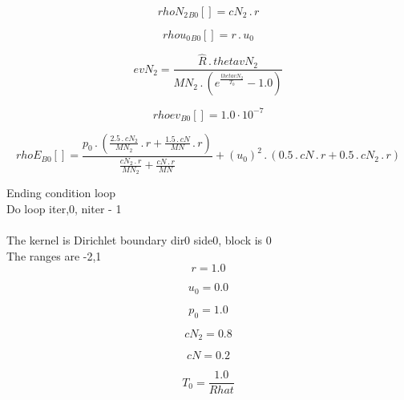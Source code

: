 \documentclass{article}
\begin{document}
\begin{dmath}{rhoN_{2}{_{B0}}}[{}] = cN_{2} \,.\, r\end{dmath}

\begin{dmath}{rhou_{0}{_{B0}}}[{}] = r \,.\, u_{0}\end{dmath}

\begin{dmath}evN_{2} = \frac{\hat{R} \,.\, thetavN_{2}}{MN_{2} \,.\, \left(e^{\frac{thetavN_{2}}{T_{0}}} - 1.0\right)}\end{dmath}

\begin{dmath}{rhoev{_{B0}}}[{}] = 1.0 \cdot 10^{-7}\end{dmath}

\begin{dmath}{rhoE{_{B0}}}[{}] = \frac{p_{0} \,.\, \left(\frac{2.5 \,.\, cN_{2}}{MN_{2}} \,.\, r + \frac{1.5 \,.\, cN}{MN} \,.\, r\right)}{\frac{cN_{2} \,.\, r}{MN_{2}} + \frac{cN \,.\, r}{MN}} + \left(u_{0} \right)^{2} \,.\, \left(0.5 \,.\, cN \,.\, 
r + 0.5 \,.\, cN_{2} \,.\, r\right)\end{dmath}

\noindent Ending condition loop %
\\\noindent Do loop iter,0, niter - 1\\
\\\noindent The kernel is Dirichlet boundary dir0 side0, block is 0\\\noindent The ranges are -2,1\\\begin{dmath}r = 1.0\end{dmath}

\begin{dmath}u_{0} = 0.0\end{dmath}

\begin{dmath}p_{0} = 1.0\end{dmath}

\begin{dmath}cN_{2} = 0.8\end{dmath}

\begin{dmath}cN = 0.2\end{dmath}

\begin{dmath}T_{0} = \frac{1.0}{Rhat}\end{dmath}
\end{document}
